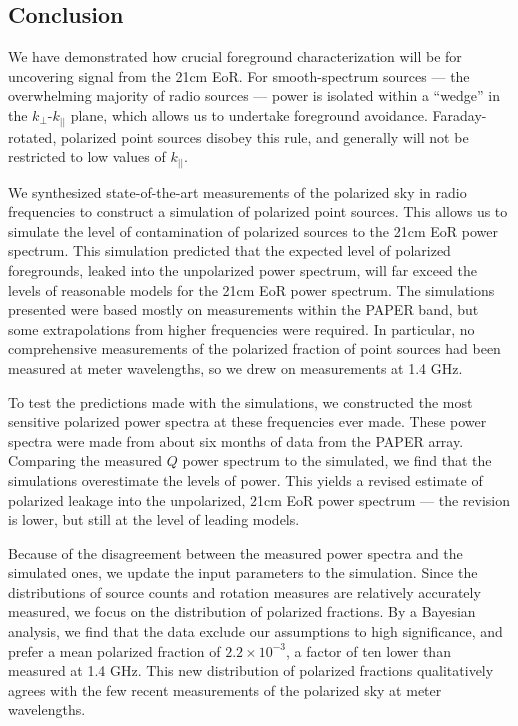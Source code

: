 \begin{partChapter}
\chapter{Conclusion}


We have demonstrated how crucial foreground characterization will be for uncovering signal from the
21cm EoR. For smooth-spectrum sources --- the overwhelming majority of radio sources --- power is
isolated within a ``wedge'' in the $k_\perp$-$k_{||}$ plane, which allows us to undertake foreground
avoidance. Faraday-rotated, polarized point sources disobey this rule, and generally will not be
restricted to low values of $k_{||}$. 

We synthesized state-of-the-art measurements of the polarized sky in radio frequencies to construct
a simulation of polarized point sources. This allows us to simulate the level of contamination of
polarized sources to the 21cm EoR power spectrum. This simulation predicted that the expected level
of polarized foregrounds, leaked into the unpolarized power spectrum, will far exceed the levels of
reasonable models for the 21cm EoR power spectrum. The simulations presented were based mostly on
measurements within the PAPER band, but some extrapolations from higher frequencies were required.
In particular, no comprehensive measurements of the polarized fraction of point sources had been
measured at meter wavelengths, so we drew on measurements at 1.4 GHz. 

To test the predictions made with the simulations, we constructed the most sensitive polarized power
spectra at these frequencies ever made. These power spectra were made from about six months of data
from the PAPER array. Comparing the measured $Q$ power spectrum to the simulated, we find that the
simulations overestimate the levels of power. This yields a revised estimate of polarized leakage
into the unpolarized, 21cm EoR power spectrum --- the revision is lower, but still at the level of
leading models. 

Because of the disagreement between the measured power spectra and the simulated
ones, we update the input parameters to the simulation. Since the distributions of source counts 
and rotation measures are relatively accurately measured, we focus on the distribution of polarized
fractions. By a Bayesian analysis, we find that the data exclude our assumptions to high
significance, and prefer a mean polarized fraction of $2.2\times10^{-3}$, a factor of ten lower than
measured at 1.4 GHz. This new distribution of polarized fractions qualitatively agrees with the few
recent measurements of the polarized sky at meter wavelengths. 


\end{partChapter}
